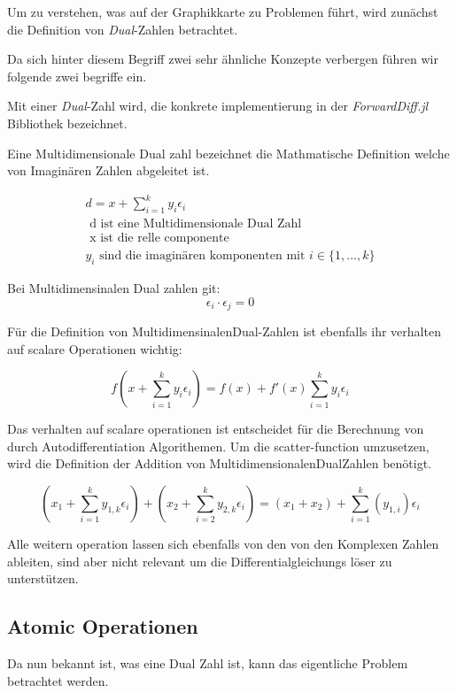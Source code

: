 Um zu verstehen, was auf der Graphikkarte zu Problemen führt, wird zunächst die Definition von \textit{Dual}-Zahlen betrachtet.

Da sich hinter diesem Begriff zwei sehr ähnliche Konzepte verbergen führen wir folgende zwei begriffe ein.

Mit einer \textit{Dual}-Zahl wird, die konkrete implementierung in der \textit{ForwardDiff.jl} Bibliothek bezeichnet.

Eine Multidimensionale Dual zahl bezeichnet die Mathmatische Definition welche von Imaginären Zahlen abgeleitet ist.

\begin{gather*}
 d = x + \sum_{i = 1}^{k} y_i \epsilon_i \\
	\text{ d ist eine Multidimensionale Dual Zahl } \\
	\text{ x ist die relle componente } \\
	y_i \text{ sind die imaginären komponenten mit } i \in \{1, ..., k\}
\end{gather*}

Bei Multidimensinalen Dual zahlen git:
$$
 \epsilon_i \cdot \epsilon_j = 0
$$

Für die Definition von MultidimensinalenDual-Zahlen ist ebenfalls ihr verhalten auf scalare Operationen wichtig:

$$
 f( x + \sum_{i = 1}^{k} y_i \epsilon_i  ) = f(x) +  f'(x) \sum_{i = 1}^{k} y_i \epsilon_i
$$
\cite{juliaForwardDiffPackage}


Das verhalten auf scalare operationen ist entscheidet für die Berechnung von durch Autodifferentiation Algorithemen.
Um die scatter-function umzusetzen, wird die Definition der Addition von MultidimensionalenDualZahlen \cite{RecentAdvances} benötigt.

$$
(x_1 + \sum_{i = 1}^{k} y_{1,k} \epsilon_i) + ( x_2 + \sum_{i = 2}^{k} y_{2,k} \epsilon_i) = (x_1 + x_2) + \sum_{i = 1}^{k} (y_{1, i}) \epsilon_i
$$

Alle weitern operation lassen sich ebenfalls von den von den Komplexen Zahlen ableiten, 
sind aber nicht relevant um die Differentialgleichungs löser zu unterstützen.


\subsection{Atomic Operationen}

Da nun bekannt ist, was eine Dual Zahl ist, 
kann das eigentliche Problem betrachtet werden.

